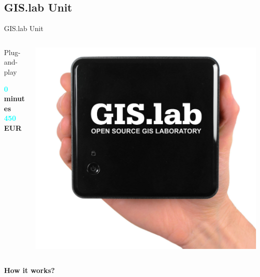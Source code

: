 \documentclass[12pt]{beamer}
\begin{document}
\subsection{GIS.lab Unit}
\begin{frame}{GIS.lab Unit}
	\begin{minipage}[\textheight]{\textwidth}
	\begin{columns}[T]
		\begin{column}{0.5\textwidth}
			\vspace{0.3\textheight}
			Plug-and-play
			\begin{flushleft}
				\textbf{\textcolor{Cyan}{0} minutes} \\
				\textbf{\textcolor{Cyan}{450} EUR} \\
			\end{flushleft}
		\end{column}
		\begin{column}{0.5\textwidth}
			\includegraphics[keepaspectratio=true,width=\textwidth]{images/gislab-unit.png}
		\end{column}
	\end{columns}
	\end{minipage}
\end{frame}


\begin{frame}
	\LARGE \textbf{How it works?}
\end{frame}
\end{document}
